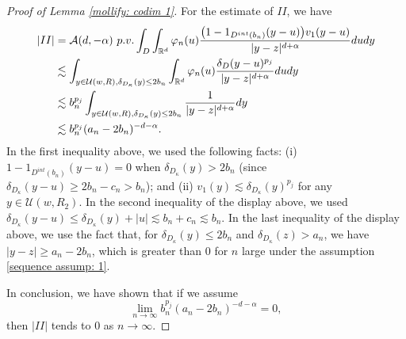 \documentclass[12pt,a4paper]{amsart}
\numberwithin{equation}{section}
\theoremstyle{plain}
\newcommand{\mc}{\mathcal}
\newcommand{\mb}{\mathbb}
\newcommand{\1}{\mathbbm{1}}
\begin{document}
\begin{proof}[Proof of Lemma \ref{mollify: codim 1}]
For the estimate of $II$, we have 
\begin{align*}
|II|& = \mc A(d,-\alpha) {\ \rm p.v.}\int_{D} \int_{\mb R^d} \varphi_n(u) \frac{\big(1 - 1_{D^{int}(b_n)}(y-u)\big)v_1(y-u)}{|y-z|^{d+\alpha}} dudy \\
& \lesssim \int_{y \in \mc U(w,R), 
\delta_{D_\kappa}(y)\le 2b_n} 
\int_{\mb R^d} \varphi_n(u)\frac{\delta_{D}(y-u)^{p_j}}{|y-z|^{d+\alpha}} du dy \\
& \lesssim b_n^{p_j} \int_{y \in \mc U(w,R), 
\delta_{D_\kappa}(y)\le 2b_n} 
\frac{1}{|y-z|^{d+\alpha}}dy  \\
& \lesssim b_n^{p_j} (a_n - 2b_n)^{-d-\alpha}.
\end{align*}
In the first inequality above, we used the following facts:
(i) $1 - 1_{D^{int}(b_n)}(y-u) = 0$ 
when $\delta_{D_\kappa}(y)>2b_n$
(since $\delta_{D_\kappa}(y-u) \ge 2b_n  -c_n >b_n$); 
and (ii) $v_1(y) \lesssim \delta_{D_\kappa}(y)^{p_j}$ for any $y \in \mc U(w,R_2)$. 
In the second inequality of the display above, we used $\delta_{D_\kappa}(y-u) \le \delta_{D_\kappa}(y)+|u| \lesssim b_n + c_n \lesssim b_n$.
In the last inequality of the display above, we use the fact that,  for $\delta_{D_\kappa}(y)\le 2b_n$ and $\delta_{D_\kappa}(z)>a_n$, 
we have $|y-z| \ge a_n - 2b_n$, which is greater than $0$ for $n$ large under the assumption \eqref{sequence assump: 1}. 

In conclusion, we have shown that if we assume 
\begin{equation} \label{sequence assump: 2}
\lim_{n \to \infty} b_n^{p_j} (a_n - 2b_n)^{-d-\alpha} = 0,
\end{equation}
then $|II|$ tends to 0 as $n\to\infty$.


\end{proof}
\end{document}
